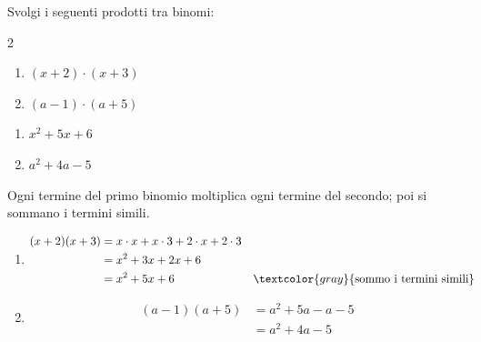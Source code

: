 \begin{question}[ID=1.2, subtitle={Prodotti tra binomi}, tags={prodotti, polinomi}, difficulty=facile]
Svolgi i seguenti prodotti tra binomi:
\begin{center}\begin{minipage}{0.92\linewidth}
\begin{multicols}{2}
\begin{enumerate}[leftmargin=3.2cm]
\item $(x+2) \cdot (x+3)$
\item $(a-1) \cdot (a+5)$
\end{enumerate}
\end{multicols}
\end{minipage}\end{center}
\begin{solution}
\begin{enumerate}
    \item $x^2+5x+6$
    \item $a^2+4a-5$
\end{enumerate}
\end{solution}
\begin{explanation}
Ogni termine del primo binomio moltiplica ogni termine del secondo; poi si sommano i termini simili.
\begin{enumerate}
    \item \[\begin{aligned}
    (x+2)(x+3) &= x\cdot x+x\cdot3+2\cdot x+2\cdot3\\
    &= x^2+3x+2x+6\\
    &= x^2+5x+6 && \textcolor{gray}{\text{sommo i termini simili}}
    \end{aligned}\]
    \item \[\begin{aligned}
    (a-1)(a+5) &= a^2+5a-a-5\\
    &= a^2+4a-5
    \end{aligned}\]
\end{enumerate}
\end{explanation}
\end{question}

